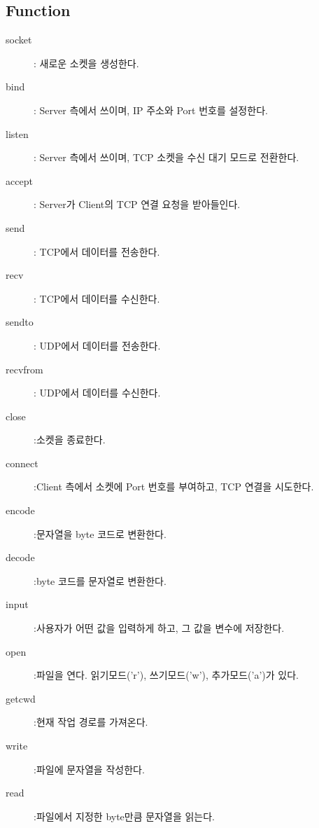 \subsection{Function}
\begin{description}
    \item[socket] : 새로운 소켓을 생성한다. \vspace{-1mm}
    \item[bind] : Server 측에서 쓰이며, IP 주소와 Port 번호를 설정한다. \vspace{-1mm}
    \item[listen] : Server 측에서 쓰이며, TCP 소켓을 수신 대기 모드로 전환한다. \vspace{-1mm}
    \item[accept] : Server가 Client의 TCP 연결 요청을 받아들인다. \vspace{-1mm}
    \item[send] : TCP에서 데이터를 전송한다. \vspace{-1mm}
    \item[recv] : TCP에서 데이터를 수신한다. \vspace{-1mm}
    \item[sendto] : UDP에서 데이터를 전송한다. \vspace{-1mm}
    \item[recvfrom] : UDP에서 데이터를 수신한다. \vspace{-1mm}
    \item[close] :소켓을 종료한다. \vspace{-1mm}
    \item[connect] :Client 측에서 소켓에 Port 번호를 부여하고, TCP 연결을 시도한다. \vspace{-1mm}
    \item[encode] :문자열을 byte 코드로 변환한다. \vspace{-1mm}
    \item[decode] :byte 코드를 문자열로 변환한다. \vspace{-1mm}
    \item[input] :사용자가 어떤 값을 입력하게 하고, 그 값을 변수에 저장한다. \vspace{-1mm}
    \item[open] :파일을 연다. 읽기모드(’r’), 쓰기모드(’w’), 추가모드(’a’)가 있다. \vspace{-1mm}
    \item[getcwd] :현재 작업 경로를 가져온다. \vspace{-1mm}
    \item[write] :파일에 문자열을 작성한다. \vspace{-1mm}
    \item[read] :파일에서 지정한 byte만큼 문자열을 읽는다. \vspace{-1mm}
\end{description}
\newpage